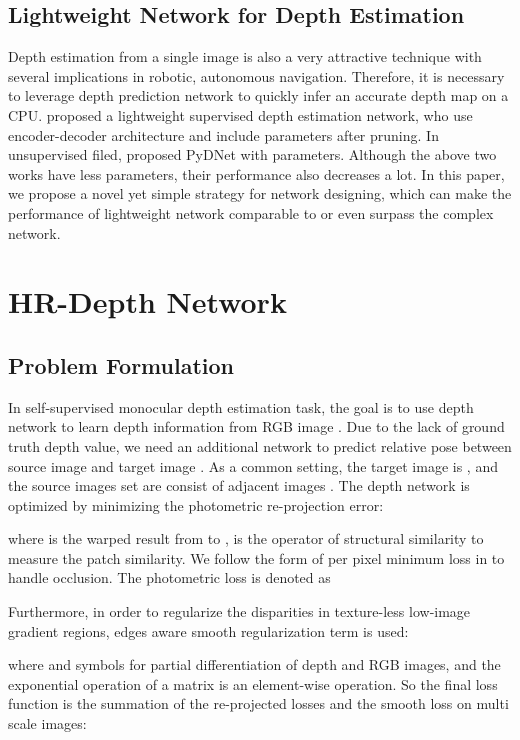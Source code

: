 \documentclass[letterpaper]{article} \usepackage{aaai21}  \usepackage{times}  \usepackage{helvet} \usepackage{courier}  \usepackage[hyphens]{url}  \usepackage{graphicx} \urlstyle{rm} \def\UrlFont{\rm}  \usepackage{natbib}  \usepackage{caption} \frenchspacing  \setlength{\pdfpagewidth}{8.5in}  \setlength{\pdfpageheight}{11in}  \usepackage{booktabs}
\begin{document}
\subsection{Lightweight Network for Depth Estimation}
Depth estimation from a single image is also a very attractive technique with several implications in robotic, autonomous navigation. Therefore, it is necessary to leverage depth prediction network to quickly infer an accurate depth map on a CPU.
\cite{wofk2019fastdepth} proposed a lightweight supervised depth estimation network, who use encoder-decoder architecture and include  parameters after pruning. In unsupervised filed, \cite{poggi2018towards,aleotti2020real} proposed PyDNet with  parameters. 
Although the above two works have less parameters, their performance also decreases a lot. In this paper, we propose a novel yet simple strategy for network designing, which can make the performance of lightweight network comparable to or even surpass the complex network.

\section{HR-Depth Network}
\subsection{Problem Formulation}
In self-supervised monocular depth estimation task, the goal is to use depth network  to learn depth information  from RGB image . Due to the lack of ground truth depth value, we need
an additional network  to predict relative pose  between source image  and target image . As a common setting, the target image is , and the source images set are consist of adjacent images .
The depth network is optimized by minimizing the photometric re-projection error:

where  is the warped result from  to ,  is the operator of structural similarity to measure the patch similarity. We follow the form of per pixel minimum loss in \cite{godard2019digging} to handle occlusion.
The photometric loss is denoted as

Furthermore, in order to regularize the disparities in texture-less low-image gradient regions, edges aware smooth regularization term is used: 
 
where  and  symbols for partial differentiation of depth and RGB images, and the exponential operation of a matrix is an element-wise operation.
So the final loss function is the summation of the re-projected losses and the smooth loss on multi scale images:
\end{document}
